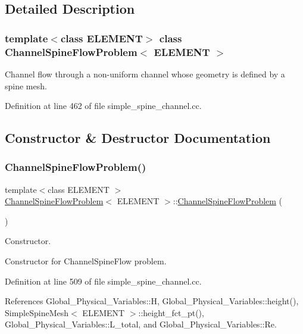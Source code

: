 \subsection{Detailed Description}
\subsubsection*{template$<$class E\+L\+E\+M\+E\+NT$>$\newline
class Channel\+Spine\+Flow\+Problem$<$ E\+L\+E\+M\+E\+N\+T $>$}

Channel flow through a non-\/uniform channel whose geometry is defined by a spine mesh. 

Definition at line 462 of file simple\+\_\+spine\+\_\+channel.\+cc.



\subsection{Constructor \& Destructor Documentation}
\mbox{\label{classChannelSpineFlowProblem_a23f1b987e3395b1d101eaf3f3b5c94b2}} 
\subsubsection{\texorpdfstring{Channel\+Spine\+Flow\+Problem()}{ChannelSpineFlowProblem()}\hspace{0.1cm}{\footnotesize\ttfamily [1/2]}}
{\footnotesize\ttfamily template$<$class E\+L\+E\+M\+E\+NT $>$ \\
\hyperlink{classChannelSpineFlowProblem}{Channel\+Spine\+Flow\+Problem}$<$ E\+L\+E\+M\+E\+NT $>$\+::\hyperlink{classChannelSpineFlowProblem}{Channel\+Spine\+Flow\+Problem} (\begin{DoxyParamCaption}{ }\end{DoxyParamCaption})}



Constructor. 

Constructor for Channel\+Spine\+Flow problem. 

Definition at line 509 of file simple\+\_\+spine\+\_\+channel.\+cc.



References Global\+\_\+\+Physical\+\_\+\+Variables\+::H, Global\+\_\+\+Physical\+\_\+\+Variables\+::height(), Simple\+Spine\+Mesh$<$ E\+L\+E\+M\+E\+N\+T $>$\+::height\+\_\+fct\+\_\+pt(), Global\+\_\+\+Physical\+\_\+\+Variables\+::\+L\+\_\+total, and Global\+\_\+\+Physical\+\_\+\+Variables\+::\+Re.



